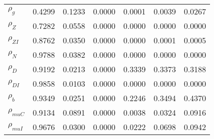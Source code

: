 \begin{center}
\begin{longtable}{lcccccc}
$ {\rho_g}             $	 & 	          0.4299	 & 	          0.1233	 & 	          0.0000	 & 	          0.0001	 & 	          0.0039	 & 	          0.0267 \\ 
$ {\rho_Z}             $	 & 	          0.7282	 & 	          0.0558	 & 	          0.0000	 & 	          0.0000	 & 	          0.0000	 & 	          0.0000 \\ 
$ {\rho_{ZI}}          $	 & 	          0.8762	 & 	          0.0350	 & 	          0.0000	 & 	          0.0000	 & 	          0.0001	 & 	          0.0005 \\ 
$ {\rho_N}             $	 & 	          0.9788	 & 	          0.0382	 & 	          0.0000	 & 	          0.0000	 & 	          0.0000	 & 	          0.0000 \\ 
$ {\rho_D}             $	 & 	          0.9192	 & 	          0.0213	 & 	          0.0000	 & 	          0.3339	 & 	          0.3373	 & 	          0.3188 \\ 
$ {\rho_{DI}}          $	 & 	          0.9858	 & 	          0.0103	 & 	          0.0000	 & 	          0.0000	 & 	          0.0000	 & 	          0.0000 \\ 
$ {\rho_b}             $	 & 	          0.9349	 & 	          0.0251	 & 	          0.0000	 & 	          0.2246	 & 	          0.3494	 & 	          0.4370 \\ 
$ {\rho_{muC}}         $	 & 	          0.9134	 & 	          0.0891	 & 	          0.0000	 & 	          0.0038	 & 	          0.0324	 & 	          0.0916 \\ 
$ {\rho_{muI}}         $	 & 	          0.9676	 & 	          0.0300	 & 	          0.0000	 & 	          0.0222	 & 	          0.0698	 & 	          0.0942 \\ 
\end{longtable}
 \end{center}
